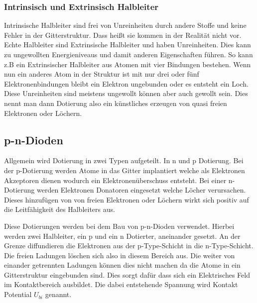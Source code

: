 \subsubsection{Intrinsisch und Extrinsisch Halbleiter}
Intrinsische Halbleiter sind frei von Unreinheiten durch andere Stoffe und keine Fehler in der Gitterstruktur. Dass heißt sie kommen in der Realität nicht vor. Echte Halbleiter sind Extrinsische Halbleiter und haben Unreinheiten. Dies kann zu ungewollten Energieniveaus und damit anderen Eigenschaften führen. So kann z.B ein Extrinsischer Halbleiter aus Atomen mit vier Bindungen bestehen. Wenn nun ein anderes Atom in der Struktur ist mit nur drei oder fünf Elektronenbindungen bleibt ein Elektron ungebunden oder es entsteht ein Loch. Diese Unreinheiten sind meistens ungewollt können aber auch gewollt sein. Dies nennt man dann Dotierung also ein künstliches erzeugen von quasi freien Elektronen oder Löchern.
\subsection{p-n-Dioden}
Allgemein wird Dotierung in zwei Typen aufgeteilt. In n und p Dotierung. Bei der p-Dotierung werden Atome in das Gitter implantiert welche als Elektronen Akzeptoren dienen wodurch ein Elektronenüberschuss entsteht. Bei einer n-Dotierung werden Elektronen Donatoren eingesetzt welche Löcher verursachen. Dieses hinzufügen von von freien Elektronen oder Löchern wirkt sich positiv auf die Leitfähigkeit des Halbleiters aus.\par
Diese Dotierungen werden bei dem Bau von p-n-Dioden verwendet. Hierbei werden zwei Halbleiter, ein p und ein n Dotierter, aneinander gesetzt. An der Grenze diffundieren die Elektronen aus der p-Type-Schicht in die n-Type-Schicht. Die freien Ladungen löschen sich also in diesem Bereich aus. Die weiter von einander getrennten Ladungen können dies nicht machen da die Atome in ein Gitterstruktur eingebunden sind. Dies sorgt dafür dass sich ein Elektrisches Feld im Kontaktbereich ausbildet. Die dabei entstehende Spannung wird Kontakt Potential $U_{bi}$ genannt.  
